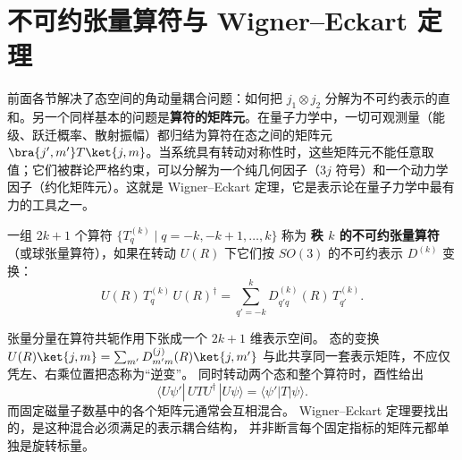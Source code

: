 \section{不可约张量算符与 Wigner--Eckart 定理}
\label{sec:wigner-eckart}
前面各节解决了态空间的角动量耦合问题：如何把 $j_1\otimes j_2$ 分解为不可约表示的直和。另一个同样基本的问题是\textbf{算符的矩阵元}。在量子力学中，一切可观测量（能级、跃迁概率、散射振幅）都归结为算符在态之间的矩阵元 $\bra{j',m'}T\ket{j,m}$。当系统具有转动对称性时，这些矩阵元不能任意取值；它们被群论严格约束，可以分解为一个纯几何因子（$3j$ 符号）和一个动力学因子（约化矩阵元）。这就是 Wigner--Eckart 定理，它是表示论在量子力学中最有力的工具之一。
\begin{definition}[不可约张量算符]
一组 $2k+1$ 个算符 $\{T^{(k)}_q\mid q=-k,-k+1,\dots,k\}$ 称为\textbf{ 秩 $k$ 的不可约张量算符}（或球张量算符），如果在转动 $U(R)$ 下它们按 $SO(3)$ 的不可约表示 $D^{(k)}$ 变换：
\begin{equation}
U(R)\,T^{(k)}_q\,U(R)^\dagger
=\sum_{q'=-k}^{k}D^{(k)}_{q'q}(R)\,T^{(k)}_{q'}.
\label{eq:tensor-op-def}
\end{equation}
\end{definition}
张量分量在算符共轭作用下张成一个 $2k+1$ 维表示空间。
态的变换 $U(R)\ket{j,m}=\sum_{m'}D^{(j)}_{m'm}(R)\ket{j,m'}$
与此共享同一套表示矩阵，不应仅凭左、右乘位置把态称为“逆变”。
同时转动两个态和整个算符时，酉性给出
\[
\langle U\psi'|\,UTU^\dagger\,|U\psi\rangle
=\langle\psi'|T|\psi\rangle.
\]
而固定磁量子数基中的各个矩阵元通常会互相混合。
Wigner--Eckart 定理要找出的，是这种混合必须满足的表示耦合结构，
并非断言每个固定指标的矩阵元都单独是旋转标量。

